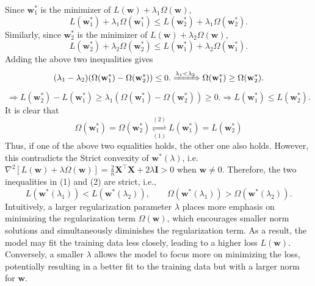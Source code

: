 \documentclass[11pt,letter,notitlepage]{article}
\begin{document}
\begin{solution}
\begin{enumerate}
	Since $\mathbf{w}_1^*$ is the minimizer of $L(\mathbf{w}) + \lambda_1 \Omega(\mathbf{w})$,
	\begin{equation}
	L(\mathbf{w}_1^*) + \lambda_1 \Omega(\mathbf{w}_1^*)
	\leq
	L(\mathbf{w}_2^*) + \lambda_1 \Omega(\mathbf{w}_2^*).
	\end{equation}
	Similarly, since $\mathbf{w}_2^*$ is the minimizer of $L(\mathbf{w}) + \lambda_2 \Omega(\mathbf{w})$,
	\begin{equation}
	L(\mathbf{w}_2^*) + \lambda_2 \Omega(\mathbf{w}_2^*)
	\leq
	L(\mathbf{w}_1^*) + \lambda_2 \Omega(\mathbf{w}_1^*).
	\end{equation}
	Adding the above two inequalities gives
	\[
	(\lambda_1 - \lambda_2)(\Omega(\mathbf{w}_1^*) - \Omega(\mathbf{w}_2^*))
	\leq
	0.
	\xRightarrow{\lambda_1 < \lambda_2}
	\Omega(\mathbf{w}_1^*) \geq \Omega(\mathbf{w}_2^*).
	\]
	\[
	\Longrightarrow
	L(\mathbf{w}_2^*) - L(\mathbf{w}_1^*)
	\geq
	\lambda_1 (\Omega(\mathbf{w}_1^*) - \Omega(\mathbf{w}_2^*))
	\geq
	0.
	\Longrightarrow
	L(\mathbf{w}_1^*) \leq L(\mathbf{w}_2^*).
	\]
	It is clear that
	\[
	\Omega(\mathbf{w}_1^*) = \Omega(\mathbf{w}_2^*)
	\underset{(1)}{\overset{(2)}{\rightleftharpoons}}
	L(\mathbf{w}_1^*) = L(\mathbf{w}_2^*)
	\]
	Thus, if one of the above two equalities holds, the other one also holds. However, this contradicts the Strict convexity of $\mathbf{w}^*(\lambda)$, i.e. $\nabla^2 [L(\mathbf{w})+\lambda \Omega(\mathbf{w})] = \frac{2}{n} \mathbf{X}^\top \mathbf{X} + 2\lambda \mathbf{I} > 0$ when $\mathbf{w} \neq 0$. Therefore, the two inequalities in (1) and (2) are strict, i.e.,
	\[
	L(\mathbf{w}^*(\lambda_1)) < L(\mathbf{w}^*(\lambda_2)),
	\qquad
	\Omega (\mathbf{w}^*(\lambda_1)) > \Omega (\mathbf{w}^*(\lambda_2)).
	\]
	Intuitively, a larger regularization parameter $\lambda$ places more emphasis on minimizing the regularization term $\Omega(\mathbf{w})$, which encourages smaller norm solutions and simultaneously diminishes the regularization term. As a result, the model may fit the training data less closely, leading to a higher loss $L(\mathbf{w})$. Conversely, a smaller $\lambda$ allows the model to focus more on minimizing the loss, potentially resulting in a better fit to the training data but with a larger norm for $\mathbf{w}$.
\end{enumerate}
\end{solution}
\end{document}
